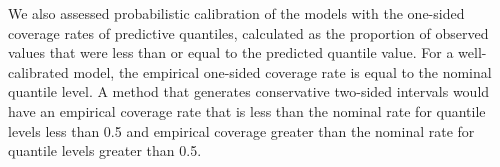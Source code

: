 \documentclass[11pt,3p,authoryear]{elsarticle}
\begin{document}
We also assessed probabilistic calibration of the models with the one-sided coverage rates of predictive quantiles, calculated as the proportion of observed values that were less than or equal to the predicted quantile value.
For a well-calibrated model, the empirical one-sided coverage rate is equal to the nominal quantile level.
A method that generates conservative two-sided intervals would have an empirical coverage rate that is less than the nominal rate for quantile levels less than 0.5 and empirical coverage greater than the nominal rate for quantile levels greater than 0.5.



\end{document}
